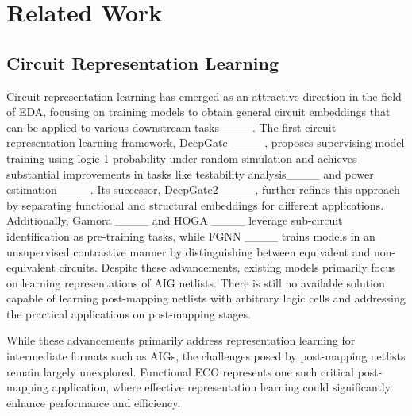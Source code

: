 \section{Related Work}
\label{Sec:Related}
\subsection{Circuit Representation Learning}
Circuit representation learning has emerged as an attractive direction in the field of EDA, focusing on training models to obtain general circuit embeddings that can be applied to various downstream tasks____. The first circuit representation learning framework, DeepGate ____, proposes supervising model training using logic-1 probability under random simulation and 
achieves substantial improvements in tasks like testability analysis____ and power estimation____.  Its successor, DeepGate2 ____, further refines this approach by separating functional and structural embeddings for different applications. Additionally, Gamora ____ and HOGA ____ leverage sub-circuit identification as pre-training tasks, while FGNN ____ trains models in an unsupervised contrastive manner by distinguishing between equivalent and non-equivalent circuits. Despite these advancements, existing models primarily focus on learning representations of AIG netlists. There is still no available solution capable of learning post-mapping netlists with arbitrary logic cells and addressing the practical applications on post-mapping stages. 

While these advancements primarily address representation learning for intermediate formats such as AIGs, the challenges posed by post-mapping netlists remain largely unexplored. Functional ECO represents one such critical post-mapping application, where effective representation learning could significantly enhance performance and efficiency.

